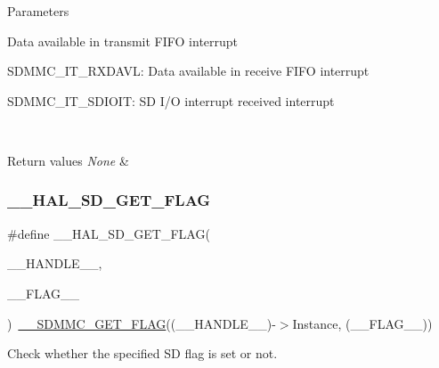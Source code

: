 \begin{DoxyParams}{Parameters}
\begin{DoxyItemize}
Data available in transmit F\+I\+FO interrupt \item S\+D\+M\+M\+C\+\_\+\+I\+T\+\_\+\+R\+X\+D\+A\+VL\+: Data available in receive F\+I\+FO interrupt \item S\+D\+M\+M\+C\+\_\+\+I\+T\+\_\+\+S\+D\+I\+O\+IT\+: SD I/O interrupt received interrupt \end{DoxyItemize}
\\
\hline
\end{DoxyParams}

\begin{DoxyRetVals}{Return values}
{\em None} & \\
\hline
\end{DoxyRetVals}
\mbox{\label{group___s_d___exported__macros_ga879fd87c01188bb86a00355a19bbde46}} 
\subsubsection{\texorpdfstring{\_\_HAL\_SD\_GET\_FLAG}{\_\_HAL\_SD\_GET\_FLAG}}
{\footnotesize\ttfamily \#define \+\_\+\+\_\+\+H\+A\+L\+\_\+\+S\+D\+\_\+\+G\+E\+T\+\_\+\+F\+L\+AG(\begin{DoxyParamCaption}\item[{}]{\+\_\+\+\_\+\+H\+A\+N\+D\+L\+E\+\_\+\+\_\+,  }\item[{}]{\+\_\+\+\_\+\+F\+L\+A\+G\+\_\+\+\_\+ }\end{DoxyParamCaption})~\mbox{\hyperlink{group___s_d_m_m_c___l_l___interrupt___clock_gaec3b40ed50180866f4b6329457157166}{\+\_\+\+\_\+\+S\+D\+M\+M\+C\+\_\+\+G\+E\+T\+\_\+\+F\+L\+AG}}((\+\_\+\+\_\+\+H\+A\+N\+D\+L\+E\+\_\+\+\_\+)-\/$>$Instance, (\+\_\+\+\_\+\+F\+L\+A\+G\+\_\+\+\_\+))}



Check whether the specified SD flag is set or not. 


